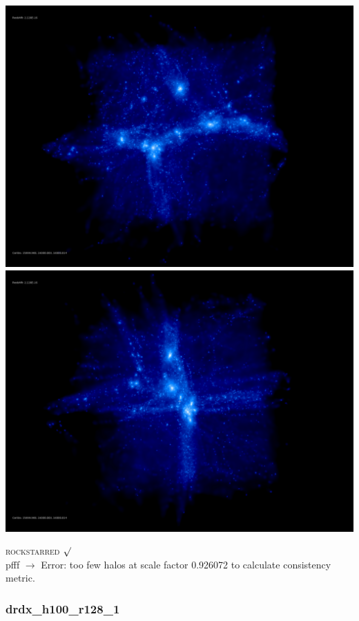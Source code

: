 \documentclass[a4paper,11pt,fleqn,oneside]{book}
\begin{document}
\includegraphics[scale=0.12]{drdx_3/rotate_00185.jpg} 
\includegraphics[scale=0.12]{drdx_3/rotate_00136.jpg} 

\textsc{rockstarred} $\surd$  \\
pfff $\rightarrow$ Error: too few halos at scale factor 0.926072 to calculate consistency metric.

\newpage
\subsubsection{drdx\_h100\_r128\_1}
\end{document}
